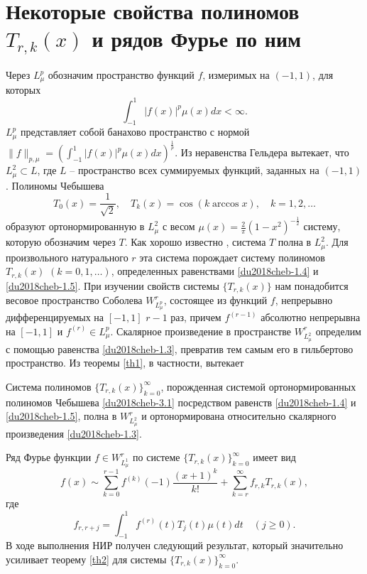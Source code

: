 \section{Некоторые свойства полиномов $T_{r,k}(x)$ и рядов Фурье по ним}
Через $L^p_\mu$ обозначим пространство  функций $f$, измеримых  на  $(-1,1)$, для которых
$$\int_{-1}^1|f(x)|^p\mu(x)dx<\infty.$$
$L^p_\mu$ представляет собой банахово пространство с нормой $\|f\|_{p,\mu}=(\int_{-1}^1|f(x)|^p\mu(x)dx)^\frac1p$. Из неравенства Гельдера вытекает, что $L^2_\mu\subset L$, где $L$ -- пространство всех суммируемых функций, заданных на $(-1,1)$. Полиномы Чебышева
\begin{equation}\label{du2018cheb-3.1}
T_0(x)=\frac{1}{\sqrt{2}},\quad T_k(x)=\cos(k\arccos x), \quad k=1,2,\ldots
\end{equation}
образуют ортонормированную  в $L_\mu^2$ с весом  $\mu(x)=\frac2\pi(1-x^2)^{-\frac12}$ систему, которую обозначим через $T$. Как хорошо известно \cite{du2018cheb-Sege}, система $T$ полна в $L_\mu^2$.   Для произвольного натурального $r$ эта система порождает  систему полиномов $T_{r,k}(x)$ $(k=0,1,\ldots)$, определенных равенствами \eqref{du2018cheb-1.4} и \eqref{du2018cheb-1.5}. При изучении свойств системы $\{T_{r,k}(x)\}$ нам понадобится весовое пространство Соболева $W^r_{L^p_\mu}$, состоящее из функций $f$, непрерывно дифференцируемых на $[-1,1]$ $r-1$ раз, причем $f^{(r-1)}$ абсолютно непрерывна на $[-1,1]$  и $f^{(r)}\in L^p_\mu$.
Скалярное произведение в пространстве $W^r_{L^2_\mu}$ определим с помощью равенства
\eqref{du2018cheb-1.3}, превратив тем самым его в гильбертово пространство. Из теоремы \ref{th1}, в частности, вытекает

\begin{theorem}\label{du2018cheb-thC}
	Система полиномов $\{T_{r,k}(x)\}_{k=0}^\infty$, порожденная системой ортонормированных полиномов Чебышева \eqref{du2018cheb-3.1} посредством равенств \eqref{du2018cheb-1.4} и \eqref{du2018cheb-1.5}, полна  в $W^r_{L^2_\mu}$ и ортонормирована относительно скалярного произведения \eqref{du2018cheb-1.3}.
\end{theorem}

Ряд Фурье функции $f\in W_{L_\mu^1}^r$ по системе   $\{T_{r,k}(x)\}_{k=0}^\infty$ имеет вид
\begin{equation}\label{du2018cheb-3.2}
f(x)\sim \sum_{k=0}^{r-1} f^{(k)}(-1)\frac{(x+1)^k}{k!}+ \sum_{k=r}^\infty f_{r,k}T_{r,k}(x),
\end{equation}
где
\begin{equation}\label{du2018cheb-3.3}
f_{r,r+j}=\int_{-1}^1 f^{(r)}(t)T_{j}(t)\mu(t)dt\quad(j\ge0).
\end{equation}
В ходе выполнения НИР получен следующий результат, который значительно усиливает теорему \ref{th2} для системы  $\{T_{r,k}(x)\}_{k=0}^\infty$.

